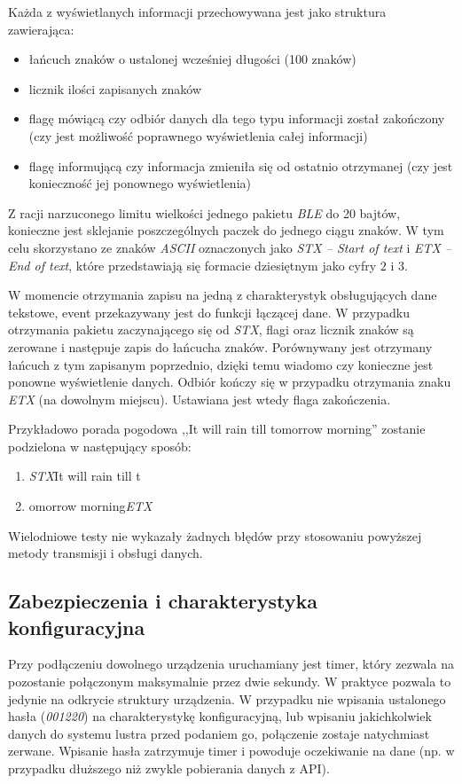\documentclass[a4paper,11pt]{article}
\begin{document}
Każda z wyświetlanych informacji przechowywana jest jako struktura zawierająca:
\begin{itemize}
	\item łańcuch znaków o ustalonej wcześniej długości (100 znaków)
	\item licznik ilości zapisanych znaków
	\item flagę mówiącą czy odbiór danych dla tego typu informacji został zakończony (czy jest możliwość poprawnego wyświetlenia całej informacji)
	\item flagę informującą czy informacja zmieniła się od ostatnio otrzymanej (czy jest konieczność jej ponownego wyświetlenia)
\end{itemize}

Z racji narzuconego limitu wielkości jednego pakietu \textit{BLE} do 20 bajtów, konieczne jest sklejanie poszczególnych paczek do jednego ciągu znaków. W tym celu skorzystano ze znaków \textit{ASCII}  oznaczonych jako \textit{STX -- Start of text} i \textit{ETX -- End of text}, które przedstawiają się formacie dziesiętnym jako cyfry $2$ i $3$.

W momencie otrzymania zapisu na jedną z charakterystyk obsługujących dane tekstowe, event przekazywany jest do funkcji łączącej dane. W przypadku otrzymania pakietu zaczynającego się od \textit{STX}, flagi oraz licznik znaków są zerowane i następuje zapis do łańcucha znaków. Porównywany jest otrzymany łańcuch z tym zapisanym poprzednio, dzięki temu wiadomo czy konieczne jest ponowne wyświetlenie danych. Odbiór kończy się w przypadku otrzymania znaku \textit{ETX} (na dowolnym miejscu). Ustawiana jest wtedy flaga zakończenia.

Przykładowo porada pogodowa ,,It will rain till tomorrow morning'' zostanie podzielona w następujący sposób:
\begin{enumerate}
	\item \textit{STX}It will rain till t
	\item omorrow morning\textit{ETX}
\end{enumerate}

Wielodniowe testy nie wykazały żadnych błędów przy stosowaniu powyższej metody transmisji i obsługi danych.

\subsection{Zabezpieczenia i charakterystyka konfiguracyjna}
Przy podłączeniu dowolnego urządzenia uruchamiany jest timer, który zezwala na pozostanie połączonym maksymalnie przez dwie sekundy. W praktyce pozwala to jedynie na odkrycie struktury urządzenia. W przypadku nie wpisania ustalonego hasła (\textit{001220}) na charakterystykę konfiguracyjną, lub wpisaniu jakichkolwiek danych do systemu lustra przed podaniem go, połączenie zostaje natychmiast zerwane. Wpisanie hasła zatrzymuje timer i powoduje oczekiwanie na dane (np. w przypadku dłuższego niż zwykle pobierania danych z API).
\end{document}
